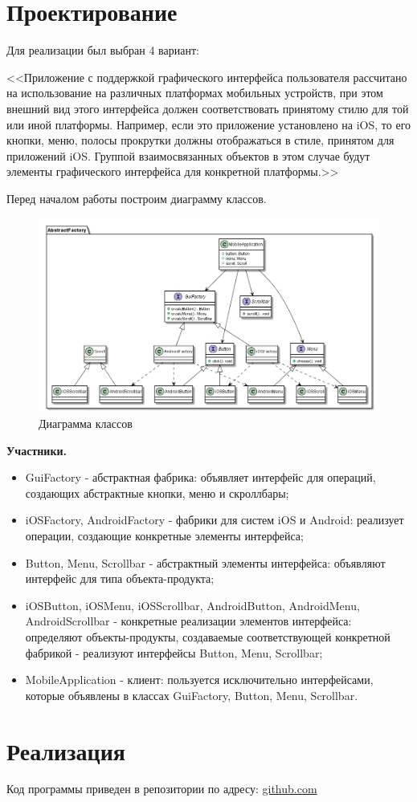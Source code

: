 \documentclass[PI,LAB]{HSEUniversity}
\begin{document}
\section{Проектирование}
Для реализации был выбран 4 вариант: 

<<Приложение с поддержкой графического интерфейса пользователя рассчитано на использование на различных платформах мобильных устройств, при этом внешний вид этого интерфейса должен соответствовать принятому стилю для той или иной платформы. Например, если это приложение установлено на iOS, то его кнопки, меню, полосы прокрутки должны отображаться в стиле, принятом для приложений iOS. Группой взаимосвязанных объектов в этом случае будут элементы графического интерфейса для конкретной платформы.>>

Перед началом работы построим диаграмму классов.
\begin{figure}[h]
  \centering
  \includegraphics[scale=0.5]{Task_CD.png}
  \caption{Диаграмма классов}
\end{figure}

\textbf{Участники.}
\begin{itemize}
  \item GuiFactory - абстрактная фабрика: объявляет интерфейс для операций, создающих абстрактные кнопки, меню и скроллбары;
  \item iOSFactory, AndroidFactory - фабрики для систем iOS и Android: реализует операции, создающие конкретные элементы интерфейса;
  \item Button, Menu, Scrollbar - абстрактный элементы интерфейса: объявляют интерфейс для типа объекта-продукта;
  \item iOSButton, iOSMenu, iOSScrollbar, AndroidButton, AndroidMenu, AndroidScrollbar - конкретные реализации элементов интерфейса: определяют объекты-продукты, создаваемые соответствующей конкретной фабрикой - реализуют интерфейсы Button, Menu, Scrollbar;
  \item MobileApplication - клиент: пользуется исключительно интерфейсами, которые объявлены в классах GuiFactory, Button, Menu, Scrollbar.
\end{itemize}

\section{Реализация}
Код программы приведен в репозитории по адресу: \href{https://github.com/rovany706/design-patterns/tree/master/AbstractFactoryAndSingleton/src/ru/ryazanov/HSE}{github.com}
\end{document}

